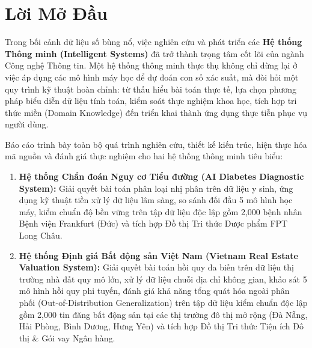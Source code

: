 \documentclass[12pt,a4paper]{report}
\begin{document}
\tableofcontents
\newpage
\listoffigures
\listoftables
\newpage
{}

\chapter*{Lời Mở Đầu}

Trong bối cảnh dữ liệu số bùng nổ, việc nghiên cứu và phát triển các \textbf{Hệ thống Thông minh (Intelligent Systems)} đã trở thành trọng tâm cốt lõi của ngành Công nghệ Thông tin. Một hệ thống thông minh thực thụ không chỉ dừng lại ở việc áp dụng các mô hình máy học để dự đoán con số xác suất, mà đòi hỏi một quy trình kỹ thuật hoàn chỉnh: từ thấu hiểu bài toán thực tế, lựa chọn phương pháp biểu diễn dữ liệu tính toán, kiểm soát thực nghiệm khoa học, tích hợp tri thức miền (Domain Knowledge) đến triển khai thành ứng dụng thực tiễn phục vụ người dùng.

Báo cáo trình bày toàn bộ quá trình nghiên cứu, thiết kế kiến trúc, hiện thực hóa mã nguồn và đánh giá thực nghiệm cho hai hệ thống thông minh tiêu biểu:
\begin{enumerate}[leftmargin=2em]
    \item \textbf{Hệ thống Chẩn đoán Nguy cơ Tiểu đường (AI Diabetes Diagnostic System):} Giải quyết bài toán phân loại nhị phân trên dữ liệu y sinh, ứng dụng kỹ thuật tiền xử lý dữ liệu lâm sàng, so sánh đối đầu 5 mô hình học máy, kiểm chuẩn độ bền vững trên tập dữ liệu độc lập gồm 2,000 bệnh nhân Bệnh viện Frankfurt (Đức) và tích hợp Đồ thị Tri thức Dược phẩm FPT Long Châu.
    \item \textbf{Hệ thống Định giá Bất động sản Việt Nam (Vietnam Real Estate Valuation System):} Giải quyết bài toán hồi quy đa biến trên dữ liệu thị trường nhà đất quy mô lớn, xử lý dữ liệu chuỗi địa chỉ không gian, khảo sát 5 mô hình hồi quy phi tuyến, đánh giá khả năng tổng quát hóa ngoài phân phối (Out-of-Distribution Generalization) trên tập dữ liệu kiểm chuẩn độc lập gồm 2,000 tin đăng bất động sản tại các thị trường đô thị mở rộng (Đà Nẵng, Hải Phòng, Bình Dương, Hưng Yên) và tích hợp Đồ thị Tri thức Tiện ích Đô thị \& Gói vay Ngân hàng.
\end{enumerate}
\end{document}
